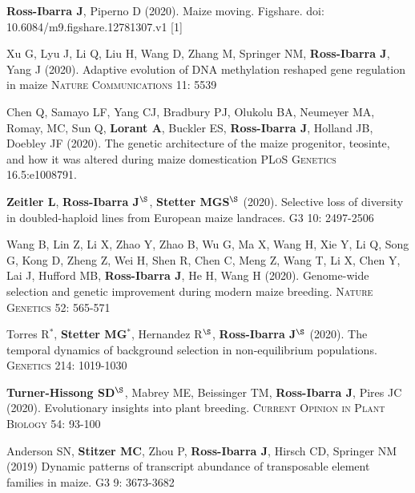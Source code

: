 \documentclass[letterpaper,10pt]{article}
\begin{document}
\begin{etaremune}
\item \textbf{Ross-Ibarra J}, Piperno D (2020). Maize moving. Figshare. doi: 10.6084/m9.figshare.12781307.v1 [1] 
\newline

\item Xu G, Lyu J, Li Q, Liu H, Wang D, Zhang M, Springer NM, \textbf{Ross-Ibarra J}, Yang J (2020). Adaptive evolution of DNA methylation reshaped gene regulation in maize \textsc{Nature Communications} 11: 5539

\item Chen Q, Samayo LF, Yang CJ, Bradbury PJ, Olukolu BA, Neumeyer MA, Romay, MC, Sun Q, \textbf{Lorant A}, Buckler ES, \textbf{Ross-Ibarra J}, Holland JB, Doebley JF (2020).
The genetic architecture of the maize progenitor, teosinte, and how it was altered during maize domestication \textsc{PLoS Genetics} 16.5:e1008791.

\item \textbf{Zeitler L}, \textbf{Ross-Ibarra J}$^\S$, \textbf{Stetter MGS}$^\S$ (2020). Selective loss of diversity in doubled-haploid lines from European maize landraces. \textsc{G3} 10: 2497-2506

\item Wang B, Lin Z, Li X, Zhao Y, Zhao B, Wu G, Ma X, Wang H, Xie Y, Li Q, Song G, Kong D, Zheng Z, Wei H, Shen R, Chen C, Meng Z, Wang T, Li X, Chen Y, Lai J, Hufford MB, \textbf{Ross-Ibarra J}, He H, Wang H (2020). Genome-wide selection and genetic improvement during modern maize breeding. \textsc{Nature Genetics} 52: 565-571

\item Torres R$^*$, \textbf{Stetter MG}$^*$, Hernandez R$^\S$, \textbf{Ross-Ibarra J}$^\S$ (2020). The temporal dynamics of background selection in non-equilibrium populations. \textsc{Genetics} 214: 1019-1030

\item \textbf{Turner-Hissong SD}$^\S$, Mabrey ME, Beissinger TM, \textbf{Ross-Ibarra J}, Pires JC (2020). Evolutionary insights into plant breeding. \textsc{Current Opinion in Plant Biology} 54: 93-100

\item  Anderson SN, \textbf{Stitzer MC},  Zhou P, \textbf{Ross-Ibarra J}, Hirsch CD, Springer NM (2019) Dynamic patterns of transcript abundance of transposable element families in maize. \textsc{G3} 9: 3673-3682


\end{etaremune}
\end{document}
